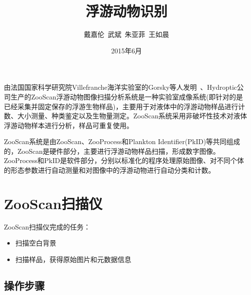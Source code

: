 \documentclass[12pt]{article}
\begin{document}
\title{\vspace{-2em}浮游动物识别\vspace{-0.7em}}
\author{戴嘉伦\ 武斌\ 朱亚菲\ 王如晨}
\date{\vspace{-0.7em}2015年6月\vspace{-0.7em}}
\maketitle\thispagestyle{fancy}
\maketitle
\tableofcontents 


由法国国家科学研究院Villefranche海洋实验室的Gorsky等人发明~\cite{gorsky2003qualitative}、Hydroptic公司生产的ZooScan浮游动物图像扫描分析系统是一种实验室成像系统(即针对的是已经采集并固定保存的浮游生物样品)，主要用于对液体中的浮游动物样品进行计数、大小测量、种类鉴定以及生物量测定。ZooScan系统采用非破坏性技术对液体浮游动物样本进行分析，样品可重复使用。

ZooScan系统是由ZooScan、ZooProcess和Plankton Identifier(PkID)等共同组成的，ZooScan是硬件部分，主要进行浮游动物样品扫描，形成数字图像。ZooProcess和PkID是软件部分，分别以标准化的程序处理原始图像、对不同个体的形态参数进行自动测量和对图像中的浮游动物进行自动分类和计数。

\section{ZooScan扫描仪}

ZooScan扫描仪完成的任务：
\begin{itemize}
\item 扫描空白背景
\item 扫描样品，获得原始图片和元数据信息
\end{itemize}

\subsection{操作步骤}
\end{document}
